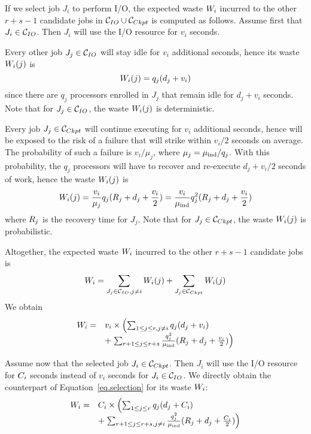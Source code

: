 If we select job $J_{i}$ to perform I/O, the expected waste $W_{i}$
incurred to the other $r+s-1$ candidate jobs in  $\mathcal{C}_{IO} \cup
\mathcal{C}_{Ckpt}$ is computed as follows. Assume first that $J_{i} \in \mathcal{C}_{IO}$.
Then  $J_{i}$ will use the I/O resource for $v_{i}$ seconds.
\begin{compactitem}
%
  \item Every other job $J_{j} \in \mathcal{C}_{IO}$ will stay idle for $v_{i}$
  additional seconds, hence its waste $W_{i}(j)$ is $$W_{i}(j) = q_{j}
  (d_{j} + v_{i})$$ since there are $q_{j}$ processors enrolled in $J_{j}$ that
  remain idle for $d_{j} + v_{i}$ seconds. Note that for $J_{j} \in \mathcal{C}_{IO}$, the
  waste $W_{i}(j)$ is deterministic.
%
  \item Every job $J_{j} \in \mathcal{C}_{Ckpt}$ will continue executing for
  $v_{i}$ additional seconds, hence will be exposed to the risk of a failure
  that will strike within $v_{i}/2$ seconds on average. The probability of such
  a failure is $v_{i}/\mu_{j}$, where $\mu_{j} =
  \mu_{\text{ind}}/q_{j}$. With this
  probability, the $q_{j}$ processors will have to recover and re-execute $d_{j} +
  v_{i}/2$ seconds of work, hence the waste $W_{i}(j)$ is $$W_{i}(j) =
  \frac{v_{i}}{\mu_{j} } q_{j} (R_{j} + d_{j} + \frac{v_{i}}{2}) =
  \frac{v_{i}}{\mu_{\text{ind}}} q^{2}_{j} (R_{j} + d_{j} + \frac{v_{i}}{2})$$ where
  $R_{j}$ is the recovery time for $J_{j}$. Note that for $J_{j} \in
  \mathcal{C}_{Ckpt}$, the waste $W_{i}(j)$ is probabilistic.
%
 \end{compactitem}
 Altogether, the expected waste $W_{i}$ incurred
to the other $r+s-1$ candidate jobs is
$$W_{i} = \sum_{J_{j} \in \mathcal{C}_{IO}, j\neq i} W_{i}(j) + \sum_{J_{j} \in \mathcal{C}_{Ckpt}} W_{i}(j)$$
We obtain
\begin{equation}
\label{eq.selection}
\begin{array}{ll}
 W_{i} = & v_{i} \times \left( \sum_{1 \leq j \leq r, j\neq i} q_{j} (d_{j} + v_{i}) \right.\\
& + \left. \sum_{r+1 \leq j \leq r+s}   \frac{q^{2}_{j}}{\mu_{\text{ind}}} (R_{j} + d_{j} + \frac{v_{i}}{2}) \right)
 \end{array}
\end{equation}

Assume now that the selected job $J_{i} \in \mathcal{C}_{Ckpt}$. Then $J_{i}$
will use the I/O resource for $C_{i}$ seconds instead of $v_{i}$
seconds for $J_{i} \in \mathcal{C}_{IO}$. We directly obtain the counterpart
of Equation~\eqref{eq.selection} for its waste $W_{i}$:
 \begin{equation}
\label{eq.selection2}
 \begin{array}{ll}
 W_{i} = & C_{i} \times \left( \sum_{1 \leq j \leq r} q_{j} (d_{j} + C_{i}) \right.\\
& + \left. \sum_{r+1 \leq j \leq r+s, j\neq i}   \frac{q^{2}_{j}}{\mu_{\text{ind}}} (R_{j} + d_{j} + \frac{C_{i}}{2}) \right)
 \end{array}
\end{equation}

